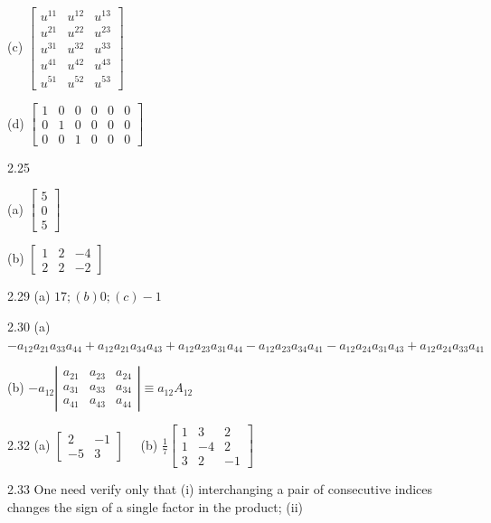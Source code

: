 \documentclass[10pt]{article}
\begin{document}
(c) $\left[\begin{array}{lll}u^{11} & u^{12} & u^{13} \\ u^{21} & u^{22} & u^{23} \\ u^{31} & u^{32} & u^{33} \\ u^{41} & u^{42} & u^{43} \\ u^{51} & u^{52} & u^{53}\end{array}\right]$

(d) $\left[\begin{array}{llllll}1 & 0 & 0 & 0 & 0 & 0 \\ 0 & 1 & 0 & 0 & 0 & 0 \\ 0 & 0 & 1 & 0 & 0 & 0\end{array}\right]$

2.25

(a) $\left[\begin{array}{l}5 \\ 0 \\ 5\end{array}\right]$

(b) $\left[\begin{array}{lll}1 & 2 & -4 \\ 2 & 2 & -2\end{array}\right]$

2.29 (a) $17 ;(b) 0 ;(c)-1$

2.30 (a) $-a_{12} a_{21} a_{33} a_{44}+a_{12} a_{21} a_{34} a_{43}+a_{12} a_{23} a_{31} a_{44}-a_{12} a_{23} a_{34} a_{41}-a_{12} a_{24} a_{31} a_{43}+a_{12} a_{24} a_{33} a_{41}$

(b) $-a_{12}\left|\begin{array}{lll}a_{21} & a_{23} & a_{24} \\ a_{31} & a_{33} & a_{34} \\ a_{41} & a_{43} & a_{44}\end{array}\right| \equiv a_{12} A_{12}$

2.32 (a) $\left[\begin{array}{rr}2 & -1 \\ -5 & 3\end{array}\right] \quad$ (b) $\frac{1}{7}\left[\begin{array}{rrr}1 & 3 & 2 \\ 1 & -4 & 2 \\ 3 & 2 & -1\end{array}\right]$

2.33 One need verify only that (i) interchanging a pair of consecutive indices changes the sign of a single factor in the product; (ii)
\end{document}
